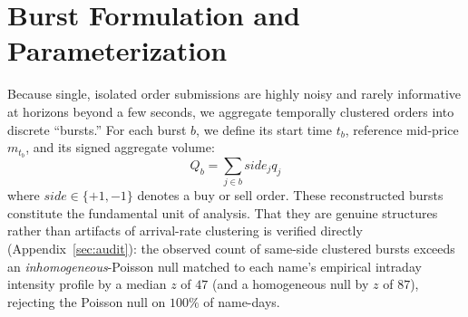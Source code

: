 \documentclass[11pt]{article}
\begin{document}
\begin{table}[htbp]
\centering
{}
\caption{Data summary statistics for the four parameter-tuning names, chosen to span the tick-structure range (wide-tick NVDA to tick-constrained MS). \emph{Avg Daily Burst Vol} is the average daily aggregate \emph{burst} volume (shares)---the volume captured by the detector, not consolidated ADV, which for the NYSE-listed names (JPM) is roughly an order of magnitude larger. Avg Spread is the mean time-weighted quoted spread at burst initiation. These four names define the Optuna tuning set and are in-sample by construction; they carry no evaluative inference, and all reported results are on the 438-name out-of-sample cross-section.}
\label{tab:data_summary}
\end{table}

\section{Burst Formulation and Parameterization}
\label{sec:burstdef}
Because single, isolated order submissions are highly noisy and rarely informative at horizons beyond a few seconds, we aggregate temporally clustered orders into discrete ``bursts.'' For each burst $b$, we define its start time $t_{b}$, reference mid-price $m_{t_{b}}$, and its signed aggregate volume:
\begin{equation}
Q_{b} = \sum_{j \in b} side_{j} q_{j}
\end{equation}
where $side \in \{+1, -1\}$ denotes a buy or sell order. These reconstructed bursts constitute the fundamental unit of analysis. That they are genuine structures rather than artifacts of arrival-rate clustering is verified directly (Appendix~\ref{sec:audit}): the observed count of same-side clustered bursts exceeds an \emph{inhomogeneous}-Poisson null matched to each name's empirical intraday intensity profile by a median $z$ of $47$ (and a homogeneous null by $z$ of $87$), rejecting the Poisson null on $100\%$ of name-days.
\end{document}
